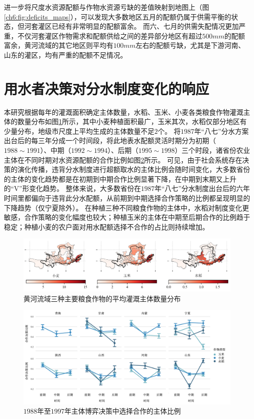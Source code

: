 进一步将尺度水资源配额与作物水资源亏缺的差值映射到地图上（图\ref{ch6:fig:deficits_maps}），可以发现大多数地区五月的配额仍属于供需平衡的状态，但河套灌区已经有非常明显的配额富余。
而六、七月的供需失配情况更加严重，不仅河套灌区作物需求和配额供给之间的差异部分地区有超过$500mm$的配额富余，黄河流域的其它地区则平均有$100mm$左右的配额亏缺，尤其是下游河南、山东的灌区，均有严重的配额不足情况。

\section{用水者决策对分水制度变化的响应}

本研究根据每年的灌溉面积确定主体数量，水稻、玉米、小麦各类粮食作物灌溉主体的数量分布如图\ref{ch6:fig:agents}所示，其中小麦种植面积最广，玉米其次，水稻仅部分地区有少量分布，地级市尺度上平均生成的主体数量不足$2$个。
将$1987$年“八七”分水方案出台后的每三年分成一个时间段，将此地表水配额灵活时期分为初期（$1988 \sim 1991$）、中期（$1992 \sim 1994$）、后期（$1995 \sim 1998$）三个时段，诸省份农业主体在不同时期对水资源配额的合作比例如图\ref{ch6:fig:compliacne}所示。
可见，由于社会系统存在决策的演化传播，违背分水制度进行超额取水的主体比例会随时间变化，大多数省份的主体的变化趋势都是在初期到中期合作比例显著下降，在中期到末期又上升的“V”形变化趋势。
整体来说，大多数省份在$1987$年“八七”分水制度出台后的六年时间里都偏向于违背此分水配额，从前期到中期选择合作策略的比例都呈现明显的下降趋势（仅宁夏除外）。
在种植三种不同粮食作物的主体中，水稻对制度变化更敏感，合作策略的变化幅度也较大；种植玉米的主体在中期至后期合作的比例趋于稳定；种植小麦的农户面对用水配额选择不合作的占比则持续增加。

\begin{figure}[htb]
    \centering
    \includegraphics[width=\textwidth]{img/ch6/ch6_agents.png}
    \caption{黄河流域三种主要粮食作物的平均灌溉主体数量分布}\label{ch6:fig:agents}
\end{figure}

\begin{figure}[htb]
    \centering
    \includegraphics[width=\textwidth]{img/ch6/ch6_compliance.png}
    \caption{$1988$年至$1997$年主体博弈决策中选择合作的主体比例}\label{ch6:fig:compliacne}
\end{figure}

